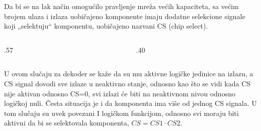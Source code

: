 \begin{frame}[label=03-s008]
\gusttekst
Da bi se na lak način omogućilo pravljenje mreža većih kapaciteta, sa većim brojem ulaza i izlaza uobičajeno komponente imaju dodatne selekcione signale koji „selektuju“ komponentu, uobičajeno nazvani CS (chip select).
\begingroup
\def\DEcs{1}\def\DEokvir{1}\def\DEnaziv{Dekoder}\def\DEtip{2/4}\def\DEulaz{CS}
\begin{columns}[c,onlytextwidth]
\begin{column}{.57\textwidth}\centering

\end{column}
\begin{column}{.40\textwidth}\centering

\end{column}
\end{columns}
\endgroup
U ovom slučaju za dekoder se kaže da su mu aktivne logičke jedinice na izlazu, a CS signal dovodi sve izlaze u neaktivno stanje, odnosno kao što se vidi kada CS nije aktivan odnosno CS=0, svi izlazi će biti na neaktivnom nivou odnosno logičkoj nuli. Česta situacija je i da komponenta ima više od jednog CS signala. U tom slučaju su uvek povezani I logičkom funkcijom, odnosno svi moraju biti aktivni da bi se selektovala komponenta, \(CS=CS1\cdot CS2\).
\end{frame}
